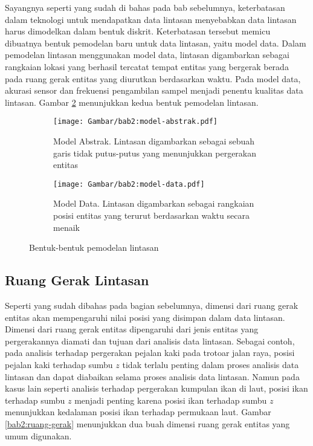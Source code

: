 Sayangnya seperti yang sudah di bahas pada bab sebelumnya, keterbatasan dalam teknologi untuk mendapatkan data lintasan menyebabkan data lintasan harus dimodelkan dalam bentuk diskrit. Keterbatasan tersebut memicu dibuatnya bentuk pemodelan baru untuk data lintasan, yaitu model data. Dalam pemodelan lintasan menggunakan model data, lintasan digambarkan sebagai rangkaian lokasi yang berhasil tercatat tempat entitas yang bergerak berada pada ruang gerak entitas yang diurutkan berdasarkan waktu. Pada model data, akurasi sensor dan frekuensi pengambilan sampel menjadi penentu kualitas data lintasan. Gambar \ref{bab2:pemodelan-lintasan} menunjukkan kedua bentuk pemodelan lintasan.

\iffalse 

\lionov{kasih jarak antara gambar kiri dan kanan}.

\fi

\begin{figure}[t]
    \centering
    \begin{subfigure}[b]{0.375\textwidth}
        \centering
        \texttt{[image: Gambar/bab2:model-abstrak.pdf]}
        \caption{Model Abstrak. Lintasan digambarkan sebagai sebuah garis tidak putus-putus yang menunjukkan pergerakan entitas}
        \label{bab2:model-abstrak}
    \end{subfigure} \hspace{1.25cm}
    \begin{subfigure}[b]{0.375\textwidth}
        \centering
        \texttt{[image: Gambar/bab2:model-data.pdf]}
        \caption{Model Data. Lintasan digambarkan sebagai rangkaian posisi entitas yang terurut berdasarkan waktu secara menaik}
    \end{subfigure}
    \caption{Bentuk-bentuk pemodelan lintasan}
    \label{bab2:pemodelan-lintasan}
\end{figure}

\subsection{Ruang Gerak Lintasan}
\label{subsec:ruang}

Seperti yang sudah dibahas pada bagian sebelumnya, dimensi dari ruang gerak entitas akan mempengaruhi nilai posisi yang disimpan dalam data lintasan. Dimensi dari ruang gerak entitas dipengaruhi dari jenis entitas yang pergerakannya diamati dan tujuan dari analisis data lintasan. Sebagai contoh, pada analisis terhadap pergerakan pejalan kaki pada trotoar jalan raya, posisi pejalan kaki terhadap sumbu $z$ tidak terlalu penting dalam proses analisis data lintasan dan dapat diabaikan selama proses analisis data lintasan. Namun pada kasus lain seperti analisis terhadap pergerakan kumpulan ikan di laut, posisi ikan terhadap sumbu $z$ menjadi penting karena posisi ikan terhadap sumbu $z$ menunjukkan kedalaman posisi ikan terhadap permukaan laut. Gambar \ref{bab2:ruang-gerak} menunjukkan dua buah dimensi ruang gerak entitas yang umum digunakan.

